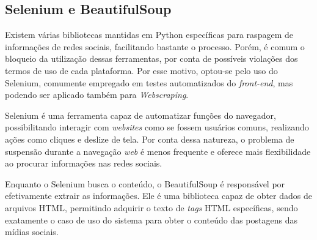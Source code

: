 \subsection{Selenium e BeautifulSoup}

Existem várias bibliotecas mantidas em Python específicas para raspagem de
informações de redes sociais, facilitando bastante o processo. Porém, é comum o
bloqueio da utilização dessas ferramentas, por conta de possíveis violações dos
termos de uso de cada plataforma. Por esse motivo, optou-se pelo uso do
Selenium, comumente empregado em testes automatizados do \textit{front-end},
mas podendo ser aplicado também para \textit{Webscraping}.

Selenium é uma ferramenta capaz de automatizar funções do navegador,
possibilitando interagir com \textit{websites} como se fossem usuários comuns,
realizando ações como cliques e deslize de tela. Por conta dessa natureza, o
problema de suspensão durante a navegação \textit{web} é menos frequente e
oferece mais flexibilidade ao procurar informações nas redes sociais.

Enquanto o Selenium busca o conteúdo, o BeautifulSoup é responsável por
efetivamente extrair as informações. Ele é uma biblioteca capaz de obter dados
de arquivos HTML, permitindo adquirir o texto de \textit{tags} HTML
específicas, sendo exatamente o caso de uso do sistema para obter o conteúdo
das postagens das mídias sociais.